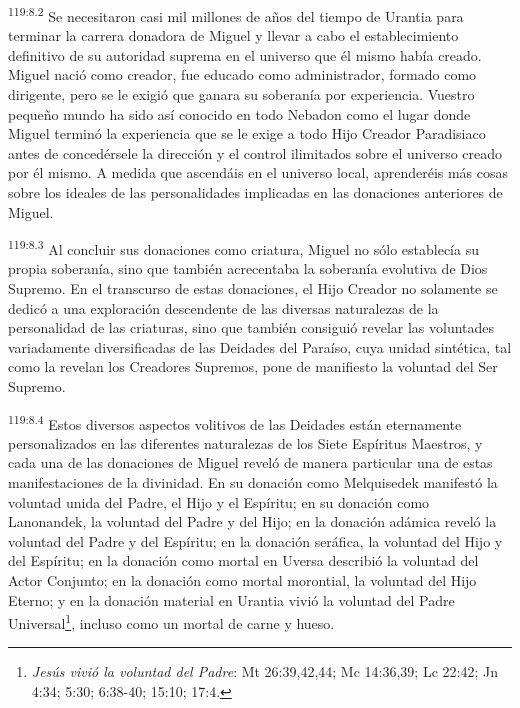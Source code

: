 \par
\textsuperscript{119:8.2} Se necesitaron casi mil millones de años del tiempo de Urantia para terminar la carrera donadora de Miguel y llevar a cabo el establecimiento definitivo de su autoridad suprema en el universo que él mismo había creado. Miguel nació como creador, fue educado como administrador, formado como dirigente, pero se le exigió que ganara su soberanía por experiencia. Vuestro pequeño mundo ha sido así conocido en todo Nebadon como el lugar donde Miguel terminó la experiencia que se le exige a todo Hijo Creador Paradisiaco antes de concedérsele la dirección y el control ilimitados sobre el universo creado por él mismo. A medida que ascendáis en el universo local, aprenderéis más cosas sobre los ideales de las personalidades implicadas en las donaciones anteriores de Miguel.

\par
\textsuperscript{119:8.3} Al concluir sus donaciones como criatura, Miguel no sólo establecía su propia soberanía, sino que también acrecentaba la soberanía evolutiva de Dios Supremo. En el transcurso de estas donaciones, el Hijo Creador no solamente se dedicó a una exploración descendente de las diversas naturalezas de la personalidad de las criaturas, sino que también consiguió revelar las voluntades variadamente diversificadas de las Deidades del Paraíso, cuya unidad sintética, tal como la revelan los Creadores Supremos, pone de manifiesto la voluntad del Ser Supremo.

\par
\textsuperscript{119:8.4} Estos diversos aspectos volitivos de las Deidades están eternamente personalizados en las diferentes naturalezas de los Siete Espíritus Maestros, y cada una de las donaciones de Miguel reveló de manera particular una de estas manifestaciones de la divinidad. En su donación como Melquisedek manifestó la voluntad unida del Padre, el Hijo y el Espíritu; en su donación como Lanonandek, la voluntad del Padre y del Hijo; en la donación adámica reveló la voluntad del Padre y del Espíritu; en la donación seráfica, la voluntad del Hijo y del Espíritu; en la donación como mortal en Uversa describió la voluntad del Actor Conjunto; en la donación como mortal morontial, la voluntad del Hijo Eterno; y en la donación material en Urantia vivió la voluntad del Padre Universal\footnote{\textit{Jesús vivió la voluntad del Padre}: Mt 26:39,42,44; Mc 14:36,39; Lc 22:42; Jn 4:34; 5:30; 6:38-40; 15:10; 17:4.}, incluso como un mortal de carne y hueso.

